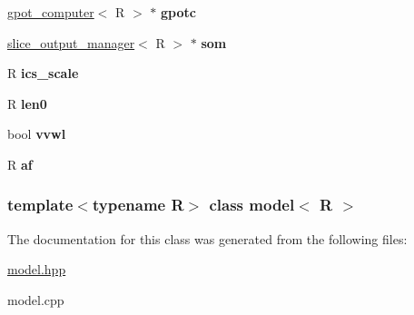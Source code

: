 \begin{DoxyCompactItemize}
\item 
\hypertarget{classmodel_a0e84b2e244bbfaf6355a9dcfa558f860}{
\hyperlink{classgpot__computer}{gpot\_\-computer}$<$ R $>$ $\ast$ {\bfseries gpotc}}
\label{classmodel_a0e84b2e244bbfaf6355a9dcfa558f860}

\item 
\hypertarget{classmodel_ac0f228a8a23b4afaea409a0295efc73a}{
\hyperlink{classslice__output__manager}{slice\_\-output\_\-manager}$<$ R $>$ $\ast$ {\bfseries som}}
\label{classmodel_ac0f228a8a23b4afaea409a0295efc73a}

\item 
\hypertarget{classmodel_adb6d67be31d8af98fa25d81213f9bc61}{
R {\bfseries ics\_\-scale}}
\label{classmodel_adb6d67be31d8af98fa25d81213f9bc61}

\item 
\hypertarget{classmodel_aef6e146814fdda23f37ec3c5e2fafc3e}{
R {\bfseries len0}}
\label{classmodel_aef6e146814fdda23f37ec3c5e2fafc3e}

\item 
\hypertarget{classmodel_a99fba28df7c61a327a81f807bab45731}{
bool {\bfseries vvwl}}
\label{classmodel_a99fba28df7c61a327a81f807bab45731}

\item 
\hypertarget{classmodel_a232f10a2703e68837cd2b7e551632f6e}{
R {\bfseries af}}
\label{classmodel_a232f10a2703e68837cd2b7e551632f6e}

\end{DoxyCompactItemize}
\subsubsection*{template$<$typename R$>$ class model$<$ R $>$}



The documentation for this class was generated from the following files:\begin{DoxyCompactItemize}
\item 
\hyperlink{model_8hpp}{model.hpp}\item 
model.cpp\end{DoxyCompactItemize}
